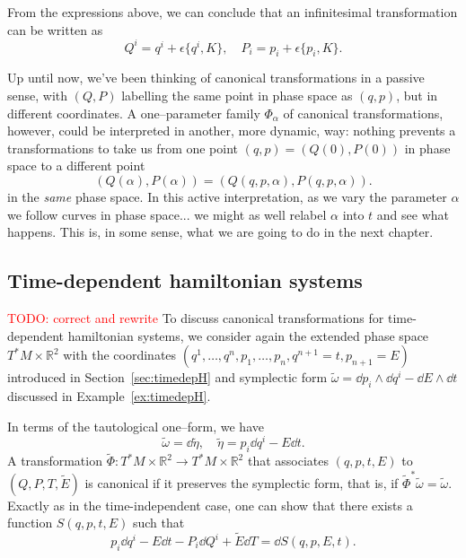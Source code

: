 \documentclass[english,fontsize=11pt,paper=b5]{scrbook}
\theoremstyle{definition}
\begin{document}
    From the expressions above, we can conclude that an infinitesimal transformation can be written as
    \begin{equation}\label{eq:forminfct}
      Q^i = q^i + \epsilon \big\{q^i, K\big\}, \quad
      P_i = p_i + \epsilon \big\{p_i, K\big\}.
    \end{equation}

    Up until now, we've been thinking of canonical transformations in a passive sense, with $(Q,P)$ labelling the same point in phase space as $(q, p)$, but in different coordinates.
    A one--parameter family $\Phi_\alpha$ of canonical transformations, however, could be interpreted in another, more dynamic, way: nothing prevents a transformations to take us from one point $(q,p)=(Q(0), P(0))$ in phase space to a different point
    \begin{equation}
      (Q(\alpha),P(\alpha)) = (Q(q,p,\alpha), P(q,p,\alpha)).
    \end{equation}
    in the \emph{same} phase space.
    In this active interpretation, as we vary the parameter $\alpha$ we follow curves in phase space... we might as well relabel $\alpha$ into $t$ and see what happens.
    This is, in some sense, what we are going to do in the next chapter.

    \subsection{Time-dependent hamiltonian systems}

    \textcolor{red}{TODO: correct and rewrite}
    To discuss canonical transformations for time-dependent hamiltonian systems, we consider again the extended phase space $T^*M\times \mathbb{R}^2$ with the coordinates $(q^1,\ldots,q^n,p_1,\ldots,p_n, q^{n+1}=t, p_{n+1}=E)$ introduced in Section~\ref{sec:timedepH} and symplectic form  $\widetilde\omega = \dd p_i\wedge \dd q^i - \dd E\wedge \dd t$ discussed in Example~\ref{ex:timedepH}.

    In terms of the tautological one--form, we have
    \begin{equation}
      \widetilde{\omega} = \dd{\widetilde{\eta}}, \quad \widetilde{\eta} = p_i \dd{q^i} - E \dd{t}.
    \end{equation}
    A transformation $\widetilde\Phi : T^*M\times \mathbb{R}^2 \to T^*M\times \mathbb{R}^2$ that associates $(q,p,t,E)$ to $(Q,P,T,\widetilde E)$ is canonical if it preserves the symplectic form, that is, if ${\widetilde\Phi}^* \widetilde \omega = \widetilde \omega$. Exactly as in the time-independent case, one can show that there exists a function $S(q,p,t,E)$ such that
    \begin{equation}\label{eq:timedepgen}
      p_i \dd q^i -E \dd t - P_i \dd Q^i + \widetilde E \dd T = \dd S(q,p,E,t).
    \end{equation}
\end{document}
